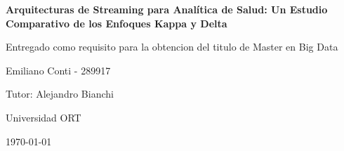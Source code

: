 \begin{titlepage}
    \centering
    {\huge\bfseries Arquitecturas de Streaming para Analítica de Salud: Un Estudio Comparativo de los Enfoques Kappa y Delta \par}
    \vspace{2cm}
    {\Large Entregado como requisito para la obtencion del
titulo de Master en Big Data\par}
    \vspace{1cm}
    {\large Emiliano Conti - 289917\par}
    \vspace{1cm}
    {\large Tutor: Alejandro Bianchi \par}
    \vspace{1cm}
    {\small Universidad ORT\par}
    \vspace{1cm}
    {\large \today\par}
\end{titlepage}